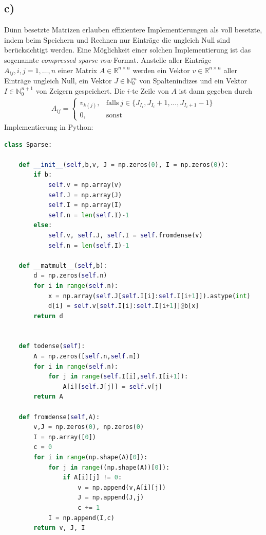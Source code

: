 \subsection*{c)}
Dünn besetzte Matrizen erlauben effizientere Implementierungen als voll besetzte, indem beim Speichern und Rechnen
nur Einträge die ungleich Null sind berücksichtigt werden. Eine Möglichkeit einer solchen Implementierung ist das sogenannte
\textit{compressed sparse row} Format. Anstelle aller Einträge $A_{ij}, i,j = 1,\dots,n$ einer Matrix $A \in \mathbb{R}^{n\times n}$
werden ein Vektor $v \in \mathbb{R}^{n\times n}$ aller Einträge ungleich Null, ein Vektor $J \in \mathbb{N}_0^m$ von Spaltenindizes
und ein Vektor $I \in \mathbb{N}_0^{n+1}$ von Zeigern gespeichert. Die $i$-te Zeile von $A$ ist dann gegeben durch
\begin{align*}
  A_{ij} = \begin{cases}
    v_{k(j)}, & \text{falls}~ j \in \{J_{I_i}, J_{I_i} + 1, \dots, J_{I_i + 1} - 1\} \\
    0, & \text{sonst}
  \end{cases}
\end{align*}
Implementierung in Python: \\
\begin{lstlisting}[language=Python]
class Sparse:

    def __init__(self,b,v, J = np.zeros(0), I = np.zeros(0)):
        if b:
            self.v = np.array(v)
            self.J = np.array(J)
            self.I = np.array(I)
            self.n = len(self.I)-1
        else:
            self.v, self.J, self.I = self.fromdense(v)
            self.n = len(self.I)-1

    def __matmult__(self,b):
        d = np.zeros(self.n)
        for i in range(self.n):
            x = np.array(self.J[self.I[i]:self.I[i+1]]).astype(int)
            d[i] = self.v[self.I[i]:self.I[i+1]]@b[x]
        return d


    def todense(self):
        A = np.zeros([self.n,self.n])
        for i in range(self.n):
            for j in range(self.I[i],self.I[i+1]):
                A[i][self.J[j]] = self.v[j]
        return A

    def fromdense(self,A):
        v,J = np.zeros(0), np.zeros(0)
        I = np.array([0])
        c = 0
        for i in range(np.shape(A)[0]):
            for j in range((np.shape(A))[0]):
                if A[i][j] != 0:
                    v = np.append(v,A[i][j])
                    J = np.append(J,j)
                    c += 1
            I = np.append(I,c)
        return v, J, I
\end{lstlisting}

